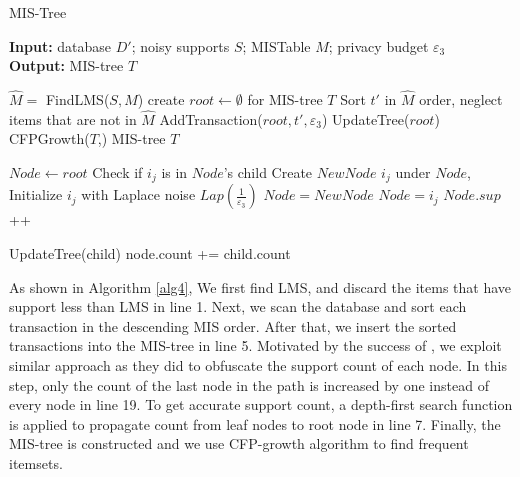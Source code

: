 \documentclass[conference]{IEEEtran}
\begin{document}
\begin{algorithm}[htbp]
    \caption{MIS-Tree}
    \hspace*{0.02in} {\bf Input:} %
    database $D'$; noisy supports $S$; MISTable $M$; privacy budget $\varepsilon_3$\\
    \hspace*{0.02in} {\bf Output:} %
    MIS-tree $T$
    
    \begin{algorithmic}[1]
        \State $\hat{M} =$ FindLMS($S,M$)
        \State create $root\leftarrow\emptyset$ for MIS-tree $T$
        \State Sort $t'$ in $\hat{M}$ order, neglect items that are not in $\hat{M}$
        \State AddTransaction($root,t',\varepsilon_3$)
        \EndFor
        \State UpdateTree($root$) 
    \State CFPGrowth($T$,)
    \State \Return MIS-tree $T$

    \State $Node \leftarrow root$
    \State Check if $i_j$ is in $Node$'s child
        \State Create $NewNode$ $i_j$ under $Node$, 
        \State Initialize $i_j$ with Laplace noise $Lap(\frac{1}{\varepsilon_3})$
        \State $Node=NewNode$
    \Else
        \State $Node=i_j$
    \EndIf
    \EndFor
    \State $Node.sup$ ++
    \EndFunction 

        \State UpdateTree(child)
        \State node.count += child.count
    \EndFor
    \EndFunction
    \end{algorithmic} 
    \label{alg4}
\end{algorithm}

As shown in Algorithm \ref{alg4}, We first find LMS, and discard the items that have support less than LMS in line 1. 
Next, we scan the database and sort each transaction in the descending MIS order. 
After that, we insert the sorted transactions into the MIS-tree in line 5. 
Motivated by the success of \cite{b8}, we exploit similar approach as they did to obfuscate the support count of each node.
In this step, only the count of the last node in the path is increased by one instead of every node in line 19.
To get accurate support count, a depth-first search function is applied to propagate count from leaf nodes to root node in line 7.
Finally, the MIS-tree is constructed and we use CFP-growth algorithm to find frequent itemsets.
\end{document}
